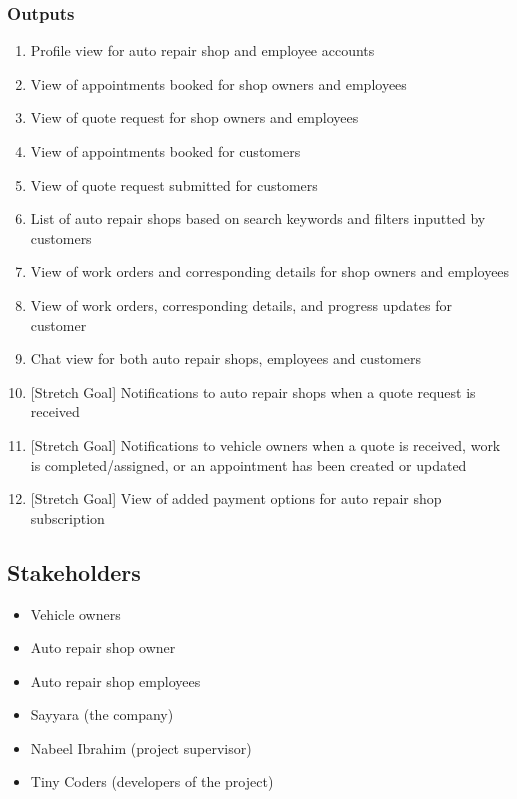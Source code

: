 \documentclass{article}
\begin{document}
\subsubsection{Outputs}
\begin{enumerate}
    \item Profile view for auto repair shop and employee accounts
    \item View of appointments booked for shop owners and employees
    \item View of quote request for shop owners and employees
    \item View of appointments booked for customers
    \item View of quote request submitted for customers
    \item List of auto repair shops based on search keywords and filters inputted by customers
    \item View of work orders and corresponding details for shop owners and employees
    \item View of work orders, corresponding details, and progress updates for customer
    \item Chat view for both auto repair shops, employees and customers
    \item {[Stretch Goal]} Notifications to auto repair shops when a quote request is received
    \item {[Stretch Goal]} Notifications to vehicle owners when a quote is received, work is completed/assigned, 
    or an appointment has been created or updated
    \item {[Stretch Goal]} View of added payment options for auto repair shop subscription
\end{enumerate}

\subsection{Stakeholders}
\begin{itemize}
    \item Vehicle owners
    \item Auto repair shop owner
    \item Auto repair shop employees
    \item Sayyara (the company)
    \item Nabeel Ibrahim (project supervisor)
    \item Tiny Coders (developers of the project)
\end{itemize}
\end{document}
